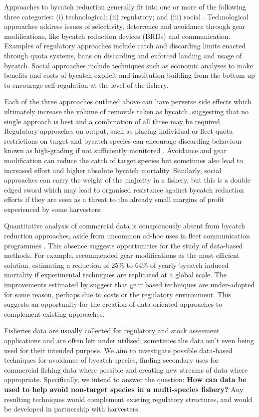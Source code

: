 \documentclass{article}
\begin{document}
Approaches to bycatch reduction generally fit into one or more of the following three categories: (i) technological; (ii) regulatory; and (iii) social \citep{hall2005managing}. Technological approaches address issues of selectivity, deterrence and avoidance through gear modifications, like bycatch reduction devices (BRDs) and communication. Examples of regulatory approaches include catch and discarding limits enacted through quota systems, bans on discarding and enforced landing and usage of bycatch. Social approaches include techniques such as economic analyses to make benefits and costs of bycatch explicit and institution building from the bottom up to encourage self regulation at the level of the fishery.

Each of the three approaches outlined above can have perverse side effects which ultimately increase the volume of removals taken as bycatch, suggesting that no single approach is best and a combination of all three may be required. Regulatory approaches on output, such as placing individual or fleet quota restrictions on target and bycatch species can encourage discarding behaviour known as high-grading if not sufficiently monitored \citep{branch2006replacing,Abbott2009195}. Avoidance and gear modification can reduce the catch of target species but sometimes also lead to increased effort and higher absolute bycatch mortality. Similarly, social approaches can carry the weight of the majority in a fishery, but this is a double edged sword which may lead to organised resistance against bycatch reduction efforts if they are seen as a threat to the already small margins of profit experienced by some harvesters.

Quantitative analysis of commercial data is conspicuously absent from bycatch reduction approaches, aside from uncommon ad-hoc uses in fleet communication programmes \citep{gilman2006fleet}. This absence suggests opportunities for the study of data-based methods. For example, \citet{hall2005managing} recommended gear modifications as the most efficient solution, estimating a reduction of 25\% to 64\% of yearly bycatch induced mortality if experimental techniques are replicated at a global scale. The improvements estimated by \citet{hall2005managing} suggest that gear based techniques are under-adopted for some reason, perhaps due to costs or the regulatory environment. This suggests an opportunity for the creation of data-oriented approaches to complement existing approaches.

Fisheries data are usually collected for regulatory and stock assesment applications and are often left under utilised; sometimes the data isn't even being used for their intended purpose. We aim to investigate possible data-based techniques for avoidance of bycatch species, finding secondary uses for commercial fishing data where possible and creating new streams of data where appropriate. Specifically, we intend to answer the question: \textbf{How can data be used to help avoid non-target species in a multi-species fishery?} Any resulting techniques would complement existing regulatory structures, and would be developed in partnership with harvesters. 
\end{document}
